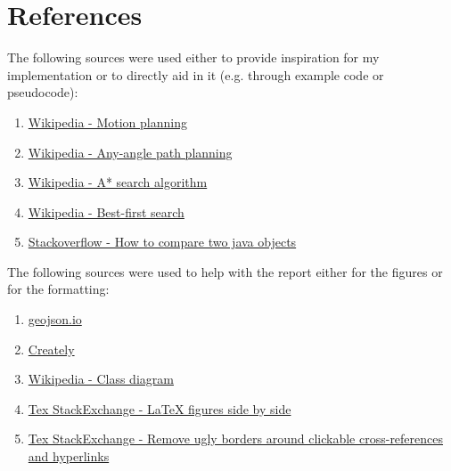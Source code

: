 \documentclass[11pt]{article}
\begin{document}
\section{References}
The following sources were used either to provide inspiration for my implementation or to directly aid in it (e.g. through example code or pseudocode):
\begin{enumerate}
    \item \href{https://en.wikipedia.org/wiki/Motion_planning#Grid-based_search}{Wikipedia - Motion planning}
    \item \href{https://en.wikipedia.org/wiki/Any-angle_path_planning}{Wikipedia - Any-angle path planning}
    \item \href{https://en.wikipedia.org/wiki/A*_search_algorithm#}{Wikipedia - A* search algorithm}
    \item \href{https://en.wikipedia.org/wiki/Best-first_search}{Wikipedia - Best-first search}
    \item \href{https://stackoverflow.com/questions/16069106/how-to-compare-two-java-objects}{Stackoverflow - How to compare two java objects}
\end{enumerate}

The following sources were used to help with the report either for the figures or for the formatting:
\begin{enumerate}
    \item \href{https://geojson.io}{geojson.io}
    \item \href{https://creately.com/}{Creately}
    \item \href{https://en.wikipedia.org/wiki/Class_diagram#Dependency}{Wikipedia - Class diagram}
    \item \href{https://tex.stackexchange.com/questions/37581/latex-figures-side-by-side#37597}{Tex StackExchange - LaTeX figures side by side}
    \item \href{https://tex.stackexchange.com/a/847}{Tex StackExchange - Remove ugly borders around clickable cross-references and hyperlinks}
\end{enumerate}
\end{document}
